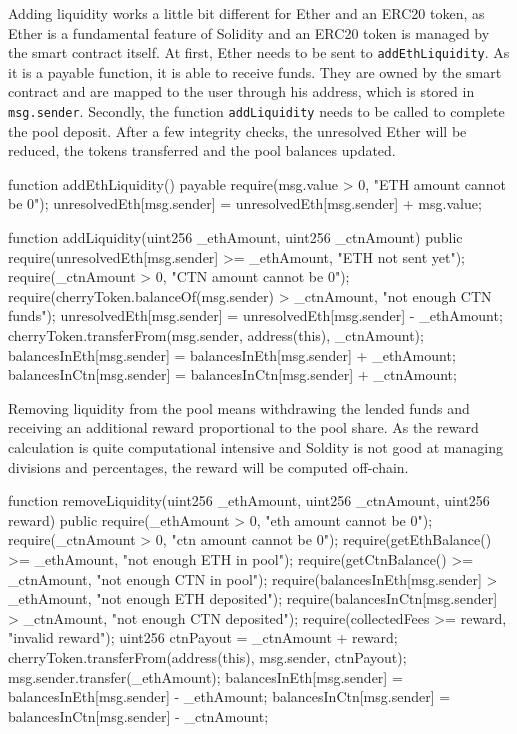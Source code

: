 Adding liquidity works a little bit different for Ether and an ERC20 token, as Ether is a fundamental feature of Solidity and an ERC20 token is managed by the smart contract itself. At first, Ether needs to be sent to \texttt{addEthLiquidity}. As it is a payable function, it is able to receive funds. They are owned by the smart contract and are mapped to the user through his address, which is stored in \texttt{msg.sender}. Secondly, the function \texttt{addLiquidity} needs to be called to complete the pool deposit. After a few integrity checks, the unresolved Ether will be reduced, the tokens transferred and the pool balances updated.
\begin{GenericCode}
function addEthLiquidity() payable {
  require(msg.value > 0, "ETH amount cannot be 0");
  unresolvedEth[msg.sender] = unresolvedEth[msg.sender] + msg.value;
}

function addLiquidity(uint256 _ethAmount, uint256 _ctnAmount) public {
  require(unresolvedEth[msg.sender] >= _ethAmount, "ETH not sent yet");
  require(_ctnAmount > 0, "CTN amount cannot be 0");
  require(cherryToken.balanceOf(msg.sender) > _ctnAmount, "not enough CTN funds");
  unresolvedEth[msg.sender] = unresolvedEth[msg.sender] - _ethAmount;
  cherryToken.transferFrom(msg.sender, address(this), _ctnAmount);
  balancesInEth[msg.sender] = balancesInEth[msg.sender] + _ethAmount;
  balancesInCtn[msg.sender] = balancesInCtn[msg.sender] + _ctnAmount;
}	
\end{GenericCode}

Removing liquidity from the pool means withdrawing the lended funds and receiving an additional reward proportional to the pool share. As the reward calculation is quite computational intensive and Soldity is not good at managing divisions and percentages, the reward will be computed off-chain.
\begin{GenericCode}
function removeLiquidity(uint256 _ethAmount, uint256 _ctnAmount, uint256 reward) public {
  require(_ethAmount > 0, "eth amount cannot be 0");
  require(_ctnAmount > 0, "ctn amount cannot be 0");
  require(getEthBalance() >= _ethAmount, "not enough ETH in pool");
  require(getCtnBalance() >= _ctnAmount, "not enough CTN in pool");
  require(balancesInEth[msg.sender] > _ethAmount, "not enough ETH deposited");
  require(balancesInCtn[msg.sender] > _ctnAmount, "not enough CTN deposited");
  require(collectedFees >= reward, "invalid reward");
  uint256 ctnPayout = _ctnAmount + reward;
  cherryToken.transferFrom(address(this), msg.sender, ctnPayout);
  msg.sender.transfer(_ethAmount);
  balancesInEth[msg.sender] = balancesInEth[msg.sender] - _ethAmount;
  balancesInCtn[msg.sender] = balancesInCtn[msg.sender] - _ctnAmount;
}	
\end{GenericCode}

